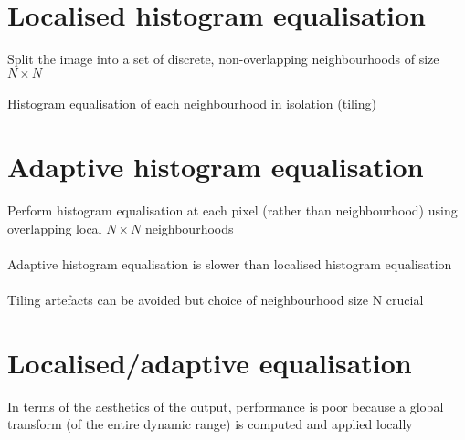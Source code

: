 \documentclass{article}[18pt]
\begin{document}
\section{Localised histogram equalisation}
Split the image into a set of discrete, non-overlapping neighbourhoods of size $N\times N$\\
\\
Histogram equalisation of each neighbourhood in isolation (tiling)
\section{Adaptive histogram equalisation}
Perform histogram equalisation at each pixel (rather than neighbourhood) using overlapping local $N\times N$ neighbourhoods\\
\\
Adaptive histogram equalisation is slower than localised histogram equalisation\\
\\
Tiling artefacts can be avoided but choice of neighbourhood size N crucial
\section{Localised/adaptive equalisation}
In terms of the aesthetics of the output, performance is poor because a global transform (of the entire dynamic range) is computed and applied locally
\end{document}
